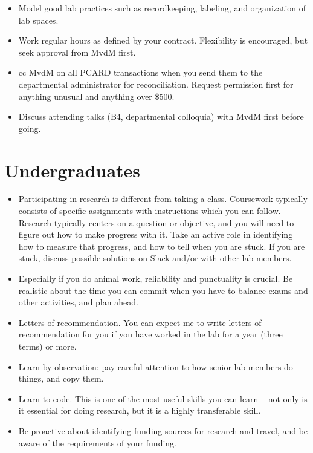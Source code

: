 \documentclass{tufte-book}
\begin{document}
\begin{itemize}
\item{Model good lab practices such as recordkeeping, labeling, and
  organization of lab spaces.}
\item{Work regular hours as defined by your contract. Flexibility is
encouraged, but seek approval from MvdM first.}
\item{cc MvdM on all PCARD transactions when you send them to the
  departmental administrator for reconciliation. Request permission
  first for anything unusual and anything over \$500.}
\item{Discuss attending talks (B4, departmental colloquia) with MvdM
  first before going.}
\end{itemize}

\section{Undergraduates}

\begin{itemize}
\item{Participating in research is different from taking a
  class. Coursework typically consists of specific assignments with
  instructions which you can follow. Research typically centers on a
  question or objective, and you will need to figure out how to make
  progress with it. Take an active role in identifying how to measure
  that progress, and how to tell when you are stuck. If you are stuck,
  discuss possible solutions on Slack and/or with other lab members.}
\item{Especially if you do animal work, reliability and punctuality is
  crucial. Be realistic about the time you can commit when you have to
  balance exams and other activities, and plan ahead.}
\item{Letters of recommendation. You can expect me to write letters of
  recommendation for you if you have worked in the lab for a year
  (three terms) or more.}
\item{Learn by observation: pay careful attention to how senior lab
  members do things, and copy them.}
\item{Learn to code. This is one of the most useful skills you can
  learn -- not only is it essential for doing research, but it is a
  highly transferable skill.}
\item{Be proactive about identifying funding sources for research and
  travel, and be aware of the requirements of your
  funding.}
\end{itemize}
\end{document}
